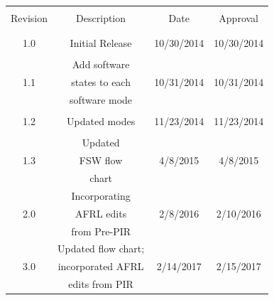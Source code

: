 \documentclass{article}
\begin{document}
\vspace{0.5in}
\begin{center}
\begin{tabular}{|c|c|c|c|}
    \hline
              &                   &              &            \\
    Revision  &  Description      &  Date        &  Approval  \\
              &                   &              &            \\ \hline
              &                   &              &            \\
    1.0       &  Initial Release  &  10/30/2014    &  10/30/2014  \\
              &                   	&              &            \\ \hline
              &       Add software            &              &            \\
    1.1       &     states to each   &  10/31/2014   &  10/31/2014 \\
              &        software mode           &              &            \\ \hline
              &                   &              &            \\
    1.2       &  Updated modes        &  11/23/2014  &  11/23/2014       \\
              &                   &              &            \\ \hline
              &       Updated            &              &            \\
    1.3       &       FSW flow         &  4/8/2015    &  4/8/2015       \\
              &        chart           &              &            \\ \hline
              &      Incorporating          &              &            \\
    2.0       &     AFRL edits           &  2/8/2016    &  2/10/2016       \\
              &     from Pre-PIR            &              &            \\ \hline
              &     Updated flow chart;          &              &            \\
	3.0       &     incorporated AFRL       &  2/14/2017    &  2/15/2017       \\
              &     edits from PIR         &              &            \\ \hline
\end{tabular}
\end{center}
\end{document}
